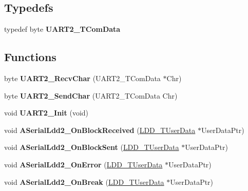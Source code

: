 \subsection*{Typedefs}
\begin{DoxyCompactItemize}
\item 
\mbox{\label{group___u_a_r_t2__module_ga44cd4ae4db6d3de22773c10e1c7d4822}} 
typedef byte {\bfseries U\+A\+R\+T2\+\_\+\+T\+Com\+Data}
\end{DoxyCompactItemize}
\subsection*{Functions}
\begin{DoxyCompactItemize}
\item 
\mbox{\label{group___u_a_r_t2__module_ga0bafc961053b5ededfaee4673d5fe7d8}} 
byte {\bfseries U\+A\+R\+T2\+\_\+\+Recv\+Char} (U\+A\+R\+T2\+\_\+\+T\+Com\+Data $\ast$Chr)
\item 
\mbox{\label{group___u_a_r_t2__module_gababd663abadf46cda2d11e6ecee533dc}} 
byte {\bfseries U\+A\+R\+T2\+\_\+\+Send\+Char} (U\+A\+R\+T2\+\_\+\+T\+Com\+Data Chr)
\item 
\mbox{\label{group___u_a_r_t2__module_gaebe7f80bf3ea5b3087c68663a0da35ed}} 
void {\bfseries U\+A\+R\+T2\+\_\+\+Init} (void)
\item 
\mbox{\label{group___u_a_r_t2__module_ga7a02cc6280b30d13707952d78f8e6c73}} 
void {\bfseries A\+Serial\+Ldd2\+\_\+\+On\+Block\+Received} (\hyperlink{group___p_e___types__module_ga0b66a73f87238a782318aa0be7578e35}{L\+D\+D\+\_\+\+T\+User\+Data} $\ast$User\+Data\+Ptr)
\item 
\mbox{\label{group___u_a_r_t2__module_ga723758484ee852a66a707036a9a38a92}} 
void {\bfseries A\+Serial\+Ldd2\+\_\+\+On\+Block\+Sent} (\hyperlink{group___p_e___types__module_ga0b66a73f87238a782318aa0be7578e35}{L\+D\+D\+\_\+\+T\+User\+Data} $\ast$User\+Data\+Ptr)
\item 
\mbox{\label{group___u_a_r_t2__module_ga145a063bdf852caee1c1b8adeb02fc77}} 
void {\bfseries A\+Serial\+Ldd2\+\_\+\+On\+Error} (\hyperlink{group___p_e___types__module_ga0b66a73f87238a782318aa0be7578e35}{L\+D\+D\+\_\+\+T\+User\+Data} $\ast$User\+Data\+Ptr)
\item 
\mbox{\label{group___u_a_r_t2__module_ga702765a2c9f1c0e914a6ca8484088ec5}} 
void {\bfseries A\+Serial\+Ldd2\+\_\+\+On\+Break} (\hyperlink{group___p_e___types__module_ga0b66a73f87238a782318aa0be7578e35}{L\+D\+D\+\_\+\+T\+User\+Data} $\ast$User\+Data\+Ptr)
\end{DoxyCompactItemize}
